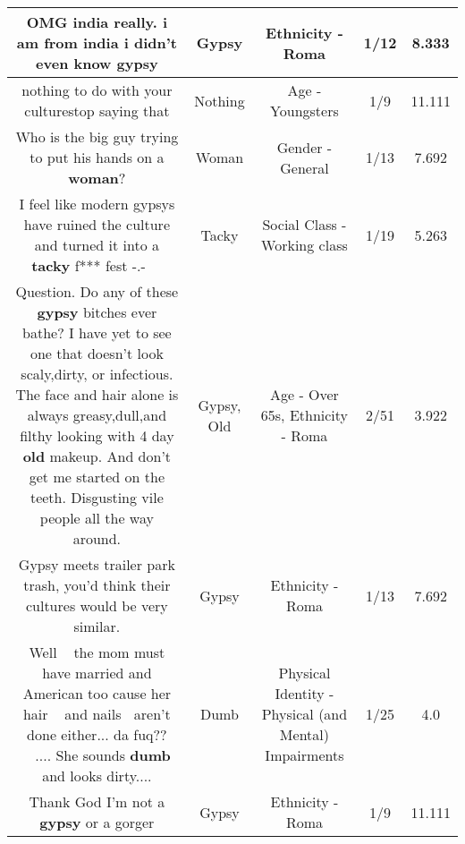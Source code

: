 \documentclass[11pt]{article}
\newlength\mylength
\begin{document}
\begin{center}
\begin{longtable}{|C{.65\mylength}|C{.30\mylength}|C{.12\mylength}|C{.12\mylength}|C{.12\mylength}|}
  \small OMG india really. i am from india i didn't even know gypsy\normalsize   & Gypsy & Ethnicity - Roma & 1/12 & 8.333 \\  \hline
  \small nothing to do with your culturestop saying that\normalsize   & Nothing & Age - Youngsters & 1/9 & 11.111 \\  \hline
  \small Who is the big guy trying to put his hands on a \textbf{woman}?\normalsize   & Woman & Gender - General & 1/13 & 7.692 \\  \hline
  \small I feel like modern gypsys have ruined the culture and turned it into a \textbf{tacky} f*** fest -.- 🤦🏼‍♀️\normalsize   & Tacky & Social Class - Working class & 1/19 & 5.263 \\  \hline
  \small Question. Do any of these \textbf{gypsy} bitches ever bathe? I have yet to see one that doesn't look scaly,dirty, or infectious. The face and hair alone is always greasy,dull,and filthy looking with 4 day \textbf{old} makeup. And don't get me started on the teeth. Disgusting vile people all the way around.\normalsize   & Gypsy, Old & Age - Over 65s, Ethnicity - Roma & 2/51 & 3.922 \\  \hline
  \small Gypsy meets trailer park trash, you'd think their cultures would be very similar.\normalsize   & Gypsy & Ethnicity - Roma & 1/13 & 7.692 \\  \hline
  \small Well 🤷🏾‍♀️the mom must have married and American too cause her hair💇🏽‍♀️ and nails💅🏽 aren't done either... da fuq??🤦🏽‍♀️.... She sounds \textbf{dumb} and looks dirty....\normalsize   & Dumb & Physical Identity - Physical (and Mental) Impairments & 1/25 & 4.0 \\  \hline
  \small Thank God I'm not a \textbf{gypsy} or a gorger\normalsize   & Gypsy & Ethnicity - Roma & 1/9 & 11.111 \\  \hline

\end{longtable}
\end{center}
\end{document}
